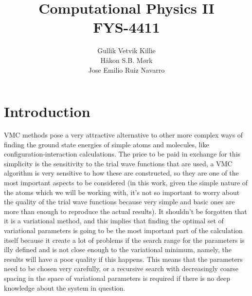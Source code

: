 \documentclass[11pt]{article}
\title{ Computational Physics II \\ FYS-4411 }
\author{Gullik Vetvik Killie\\
		Håkon S.B. Mørk\\
		Jose Emilio Ruiz Navarro
		}
\begin{document}
\maketitle


\section{Introduction}

VMC methods pose a very attractive alternative to other more complex ways of finding the ground state energies of simple atoms and molecules, like configuration-interaction calculations. The price to be paid in exchange for this simplicity is the sensitivity to the trial wave functions that are used, a VMC algorithm is very sensitive to how these are constructed, so they are one of the most important aspects to be considered (in this work, given the simple nature of the atoms which we will be working with, it's not so important to worry about the quality of the trial wave functions because very simple and basic ones are more than enough to reproduce the actual results). It shouldn't be forgotten that it is a variational method, and this implies that finding the optimal set of variational parameters is going to be the most important part of the calculation itself because it create a lot of problems if the search range for the parameters is illy defined and is not close enough to the variational minimum, namely, the results will have a poor quality if this happens. This means that the parameters need to be chosen very carefully, or a recursive search with decreasingly coarse spacing in the space of variational parameters is required if there is no deep knowledge about the system in question.\\
\end{document}
